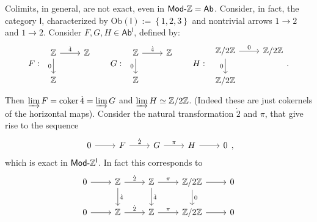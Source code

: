 \begin{rem}
	Colimits, in general, are not exact, even in $\mathsf{Mod}\text{-}\mathbb{Z} = \mathsf{Ab}$.
	Consider, in fact, the category $\mathsf{I}$, characterized by
	$\mathrm{Ob} \left(\mathsf{I}\right) := \left\{ 1, 2, 3 \right\}$ and nontrivial arrows
	$1 \to 2$ and $1 \to 2$.
	Consider $F, G, H \in \mathsf{Ab}^{\mathsf{I}}$, defined by:
	\begin{equation}
	F : \ \, 
	\begin{tikzcd}
		\Z \arrow[r, "\dot{4}", rightarrow] \arrow[d, "0"', rightarrow] & \Z \\
		\Z &
	\end{tikzcd}\qquad
	G : \ \,
	\begin{tikzcd}
		\Z \arrow[r, "\dot{4}", rightarrow] \arrow[d, "0"', rightarrow] & \Z \\
		\Z &
	\end{tikzcd}\qquad
	H : \ \,
	\begin{tikzcd}
		\mathbb{Z}/2\mathbb{Z} \arrow[r, "0", rightarrow] \arrow[d, "0"', rightarrow] & \mathbb{Z}/2\mathbb{Z} \\
		\mathbb{Z}/2\mathbb{Z} &
	\end{tikzcd}
	.\end{equation} 
	Then $\varinjlim F = \operatorname{coker} \dot{4} = \varinjlim G$ and $\varinjlim H \simeq \mathbb{Z}/2\mathbb{Z}$.
	(Indeed these are just cokernels of the horizontal maps).
	Consider the natural transformation $\dot{2}$ and $\pi$, that give rise to the sequence
	\begin{equation}
	\begin{tikzcd}
		0 \arrow[r, "", rightarrow] &
		F \arrow[r, "\dot{2}", rightarrow] &
		G \arrow[r, "\pi", rightarrow] &
		H \arrow[r, "", rightarrow] &
		0
	\end{tikzcd}
	,\end{equation} 
	which is exact in $\mathsf{Mod}\text{-}\mathbb{Z}^{\mathsf{I}}$.
	In fact this corresponds to
	\begin{equation}
	\begin{tikzcd}
		0 \arrow[r, "", rightarrow] &
		\Z \arrow[r, "\dot{2}", rightarrow] \arrow[d, "\dot{4}", rightarrow] &
		\Z \arrow[r, "\pi", rightarrow] \arrow[d, "\dot{4}", rightarrow] &
		\mathbb{Z}/2\mathbb{Z} \arrow[r, "", rightarrow] \arrow[d, "0", rightarrow] &
		0 \\
		0 \arrow[r, "", rightarrow] &
		\Z \arrow[r, "\dot{2}", rightarrow]&
		\Z \arrow[r, "\pi", rightarrow] &
		\mathbb{Z}/2\mathbb{Z} \arrow[r, "", rightarrow] &
		0
	\end{tikzcd}

\end{equation}
\end{rem}
